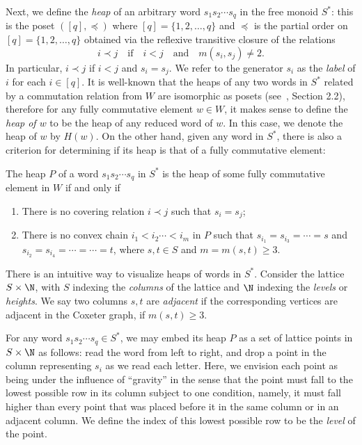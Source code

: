  Next, we define the \emph{heap} of an arbitrary word $s_1s_2\cdots s_q$ in the free
 monoid $S^*$: this is the poset $([q],\preccurlyeq)$ where
 $[q]=\{1,2,\ldots,q\}$ and $\preccurlyeq$ is the partial order on
 $[q]=\{1,2,\ldots,q\}$ obtained via the reflexive transitive closure of the relations
 \[
 i\prec j \quad\text{if}\quad i<j\quad\text{and}\quad m(s_i,s_j)\neq 2.
 \]
 In particular, $i\prec j$ if $i<j$ and $s_i=s_j$. We refer to the
 generator $s_i$ as the \emph{label} of $i$ for each $i\in [q]$. It is well-known that the heaps of
 any two words in $S^*$ related by a commutation relation from $W$ are
 isomorphic as posets (see~\cite{FC}, Section 2.2), therefore for any fully commutative element $w\in W$,
 it makes sense to define the \emph{heap of $w$} to be the heap of any reduced
 word of $w$. In this case, we denote the heap of $w$ by $H(w)$. On the other
 hand, given any word in $S^*$, there is also a criterion for
 determining if its heap is that of a fully commutative element:

 \begin{prop}[{\cite[Proposition~3.3]{FC}}]
 \label{fc criterion}
 The heap $P$ of a word $s_1s_2\cdots s_q$ in $S^*$ is the heap of some fully commutative
 element in $W$ if and only if 
 \begin{enumerate}
 \item There is no covering relation $i\prec j$ such that $s_i=s_j$;
 \item There is no convex chain $i_1<i_2\cdots <i_m$ in $P$ such that
 $s_{i_1}=s_{i_3}=\cdots = s$ and $s_{i_2}=s_{i_4}=\cdots=\cdots=t$,
 where $s,t\in S$ and $m = m(s,t)\ge 3$.
 \end{enumerate}
 \end{prop}

 There is an intuitive way to visualize heaps of words in $S^*$. Consider the lattice $S\times \N$, with $S$
 indexing the \emph{columns} of the lattice and $\N$ indexing the \emph{levels}
 or
 \emph{heights}. We say two
 columns $s,t$ are \emph{adjacent} if the corresponding vertices are adjacent in the
 Coxeter graph, \ie if $m(s,t)\ge 3$.

 For any word $s_1s_2\cdots s_q\in S^*$, we may
 embed its heap $P$ as a set of lattice points in $S\times \N$ as follows:
 read the word from left to right, and drop a point in the column representing
 $s_i$ as we read each letter. Here, we envision each point as being under the
 influence of ``gravity'' in the sense that the point must fall to the lowest
 possible row in its column subject to one condition, namely, it must fall
 higher than every point that was placed before it in the same column
 or in an adjacent column. We define the index of this lowest possible row
 to be the \emph{level} of the point. 
 
